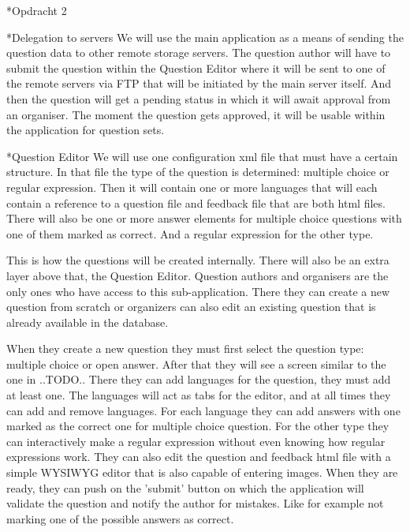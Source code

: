 \begin{section}*{Opdracht 2}
    \begin{subsection}*{Delegation to servers}
        We will use the main application as a means of sending the question data to other
        remote storage servers. The question author will have to submit the question within
        the Question Editor where it will be sent to one of the remote servers via FTP that
        will be initiated by the main server itself. And then the question will get a
        pending status in which it will await approval from an organiser. The moment
        the question gets approved, it will be usable within the application for question
        sets.
    \end{subsection}
    
    \begin{subsection}*{Question Editor}
        We will use one configuration xml file that must have a certain structure. In
        that file the type of the question is determined: multiple choice or regular
        expression. Then it will contain one or more languages that will each contain a
        reference to a question file and feedback file that are both html files. There
        will also be one or more answer elements for multiple choice questions with one
        of them marked as correct. And a regular expression for the other type.
        
        This is how the questions will be created internally. There will also be an extra
        layer above that, the Question Editor.
        Question authors and organisers are the only ones who have access to this
        sub-application. There they can create a new question from scratch or organizers
        can also edit an existing question that is already available in the database.
        
        When they create a new question they must first select the question type:
        multiple choice or open answer. After that they will see a screen similar to the
        one in ..TODO.. There they can add languages for the question, they must add at
        least one. The languages will act as tabs for the editor, and at all times they
        can add and remove languages. For each language they can add answers with
        one marked as the correct one for multiple choice question. For the other type
        they can interactively make a regular expression without even knowing how
        regular expressions work. They can also edit the question and feedback html file
        with a simple WYSIWYG editor that is also capable of entering images.
        When they are ready, they can push on the 'submit' button on which the application
        will validate the question and notify the author for mistakes. Like for example
        not marking one of the possible answers as correct.
        

\end{subsection}
\end{section}
